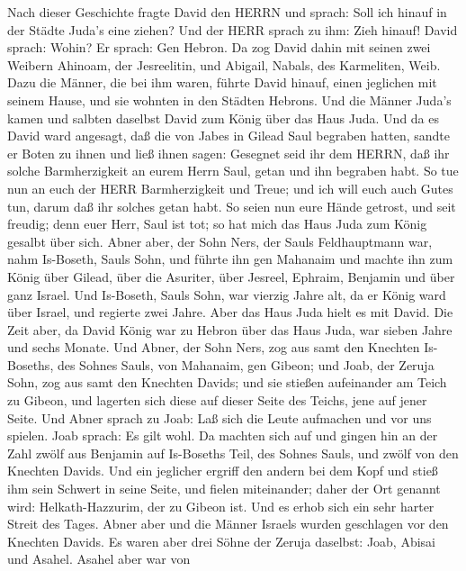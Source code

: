  Nach dieser Geschichte fragte David den HERRN und sprach:
Soll ich hinauf in der Städte Juda's eine ziehen? Und der HERR sprach zu
ihm: Zieh hinauf! David sprach: Wohin? Er sprach: Gen Hebron.
 Da zog David dahin mit seinen zwei Weibern Ahinoam, der
Jesreelitin, und Abigail, Nabals, des Karmeliten, Weib. 
Dazu die Männer, die bei ihm waren, führte David hinauf, einen jeglichen
mit seinem Hause, und sie wohnten in den Städten Hebrons. 
Und die Männer Juda's kamen und salbten daselbst David zum König über
das Haus Juda. Und da es David ward angesagt, daß die von Jabes in
Gilead Saul begraben hatten,  sandte er Boten zu ihnen und
ließ ihnen sagen: Gesegnet seid ihr dem HERRN, daß ihr solche
Barmherzigkeit an eurem Herrn Saul, getan und ihn begraben habt.
 So tue nun an euch der HERR Barmherzigkeit und Treue; und
ich will euch auch Gutes tun, darum daß ihr solches getan habt.
 So seien nun eure Hände getrost, und seit freudig; denn
euer Herr, Saul ist tot; so hat mich das Haus Juda zum König gesalbt
über sich.  Abner aber, der Sohn Ners, der Sauls
Feldhauptmann war, nahm Is-Boseth, Sauls Sohn, und führte ihn gen
Mahanaim  und machte ihn zum König über Gilead, über die
Asuriter, über Jesreel, Ephraim, Benjamin und über ganz Israel.
 Und Is-Boseth, Sauls Sohn, war vierzig Jahre alt, da er
König ward über Israel, und regierte zwei Jahre. Aber das Haus Juda
hielt es mit David.  Die Zeit aber, da David König war zu
Hebron über das Haus Juda, war sieben Jahre und sechs Monate.
 Und Abner, der Sohn Ners, zog aus samt den Knechten
Is-Boseths, des Sohnes Sauls, von Mahanaim, gen Gibeon; 
und Joab, der Zeruja Sohn, zog aus samt den Knechten Davids; und sie
stießen aufeinander am Teich zu Gibeon, und lagerten sich diese auf
dieser Seite des Teichs, jene auf jener Seite.  Und Abner
sprach zu Joab: Laß sich die Leute aufmachen und vor uns spielen. Joab
sprach: Es gilt wohl.  Da machten sich auf und gingen hin
an der Zahl zwölf aus Benjamin auf Is-Boseths Teil, des Sohnes Sauls,
und zwölf von den Knechten Davids.  Und ein jeglicher
ergriff den andern bei dem Kopf und stieß ihm sein Schwert in seine
Seite, und fielen miteinander; daher der Ort genannt wird:
Helkath-Hazzurim, der zu Gibeon ist.  Und es erhob sich ein
sehr harter Streit des Tages. Abner aber und die Männer Israels wurden
geschlagen vor den Knechten Davids.  Es waren aber drei
Söhne der Zeruja daselbst: Joab, Abisai und Asahel. Asahel aber war von
